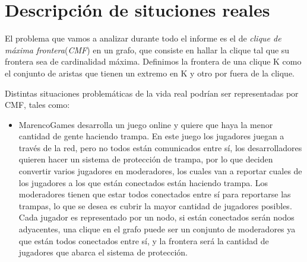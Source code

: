 \section{Descripción de situciones reales}
El problema que vamos a analizar durante todo el informe es el de \textit{clique de máxima frontera}(\textit{CMF}) en un grafo, que consiste en hallar la clique tal que su frontera sea de cardinalidad máxima. Definimos la frontera de una clique K como el conjunto de aristas que tienen un extremo en K y otro por fuera de la clique.

Distintas situaciones problemáticas de la vida real podrían ser representadas por CMF, tales como:

\begin{itemize}

\item MarencoGames desarrolla un juego online y quiere que haya la menor cantidad de gente haciendo trampa. En este juego los jugadores juegan a través de la red, pero no todos están comunicados entre sí, los desarrolladores quieren hacer un sistema de protección de trampa, por lo que deciden convertir varios jugadores en moderadores, los cuales van a reportar cuales de los jugadores a los que están conectados están haciendo trampa. Los moderadores tienen que estar todos conectados entre sí para reportarse las trampas, lo que se desea es cubrir la mayor cantidad de jugadores posibles.  Cada jugador es representado por un nodo, si están conectados serán nodos adyacentes, una clique en el grafo puede ser un conjunto de moderadores ya que están todos conectados entre sí, y la frontera será la cantidad de jugadores que abarca el sistema de protección.

\end{itemize}


